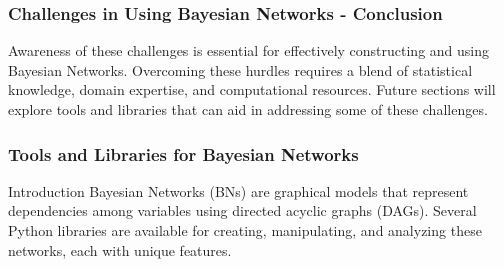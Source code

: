 \documentclass[aspectratio=169]{beamer}
\begin{document}
\begin{frame}[fragile]
    \frametitle{Challenges in Using Bayesian Networks - Conclusion}
    Awareness of these challenges is essential for effectively constructing and using Bayesian Networks. Overcoming these hurdles requires a blend of statistical knowledge, domain expertise, and computational resources. Future sections will explore tools and libraries that can aid in addressing some of these challenges.
\end{frame}

\begin{frame}
    \frametitle{Tools and Libraries for Bayesian Networks}
    \begin{block}{Introduction}
        Bayesian Networks (BNs) are graphical models that represent dependencies among variables using directed acyclic graphs (DAGs). 
        Several Python libraries are available for creating, manipulating, and analyzing these networks, each with unique features.
    \end{block}
\end{frame}
\end{document}
